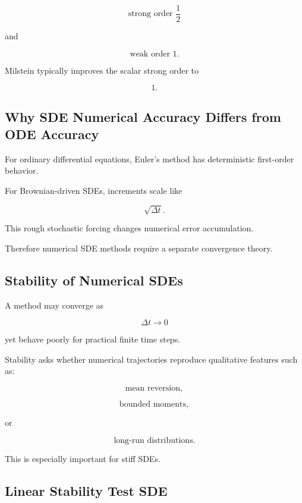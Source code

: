\[
\boxed{
\text{strong order } \frac12
}
\]

and

\[
\boxed{
\text{weak order }1.
}
\]

Milstein typically improves the scalar strong order to

\[
\boxed{
1.
}
\]

\subsection{Why SDE Numerical Accuracy Differs from ODE Accuracy}
\label{subsec:sde-vs-ode-numerics}

For ordinary differential equations, Euler's method has deterministic
first-order behavior.

For Brownian-driven SDEs, increments scale like

\[
\sqrt{\Delta t}.
\]

This rough stochastic forcing changes numerical error accumulation.

Therefore numerical SDE methods require a separate convergence theory.

\subsection{Stability of Numerical SDEs}
\label{subsec:sde-numerical-stability}

A method may converge as

\[
\Delta t\to0
\]

yet behave poorly for practical finite time steps.

Stability asks whether numerical trajectories reproduce qualitative
features such as:

\[
\text{mean reversion},
\]

\[
\text{bounded moments},
\]

or

\[
\text{long-run distributions}.
\]

This is especially important for stiff SDEs.

\subsection{Linear Stability Test SDE}
\label{subsec:linear-stability-sde}

